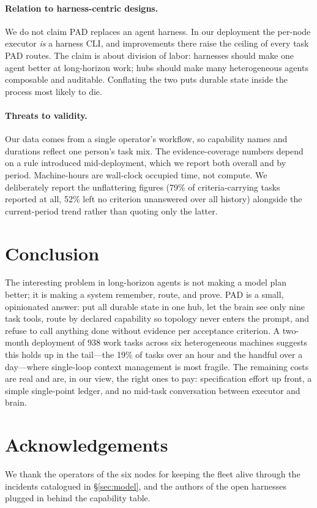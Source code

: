 \documentclass{article}
\begin{document}
\paragraph{Relation to harness-centric designs.} We do not claim PAD replaces an
agent harness. In our deployment the per-node executor \emph{is} a harness CLI, and
improvements there raise the ceiling of every task PAD routes. The claim is about
division of labor: harnesses should make one agent better at long-horizon work;
hubs should make many heterogeneous agents composable and auditable. Conflating the
two puts durable state inside the process most likely to die.

\paragraph{Threats to validity.} Our data comes from a single operator's workflow,
so capability names and durations reflect one person's task mix. The evidence-coverage
numbers depend on a rule introduced mid-deployment, which we report both overall and
by period. Machine-hours are wall-clock occupied time, not compute. We deliberately
report the unflattering figures (79\% of criteria-carrying tasks reported at all,
52\% left no criterion unanswered over all history) alongside the current-period
trend rather than quoting only the latter.

\section{Conclusion}

The interesting problem in long-horizon agents is not making a model plan better; it
is making a system remember, route, and prove. PAD is a small, opinionated answer:
put all durable state in one hub, let the brain see only nine task tools, route by
declared capability so topology never enters the prompt, and refuse to call anything
done without evidence per acceptance criterion. A two-month deployment of 938 work
tasks across six heterogeneous machines suggests this holds up in the tail---the
19\% of tasks over an hour and the handful over a day---where single-loop context
management is most fragile. The remaining costs are real and are, in our view, the
right ones to pay: specification effort up front, a simple single-point ledger, and
no mid-task conversation between executor and brain.

\section*{Acknowledgements}
We thank the operators of the six nodes for keeping the fleet alive through the
incidents catalogued in \S\ref{sec:model}, and the authors of the open harnesses
plugged in behind the capability table.
\end{document}
